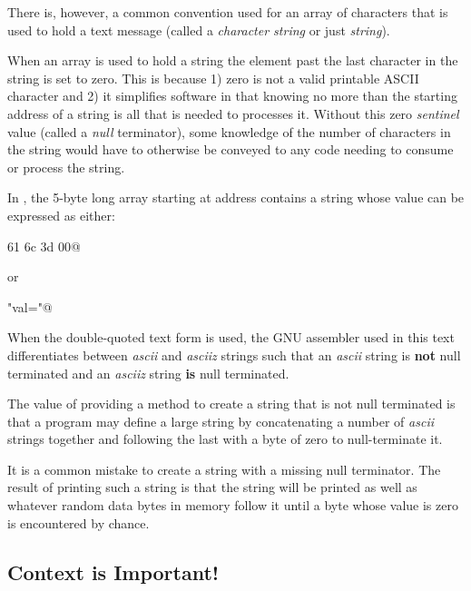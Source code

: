 There is, however, a common convention used for an array of 
characters that is used to hold a text message 
(called a {\em character string} or just {\em string}).

When an array is used to hold a string the element past the last
character in the string is set to zero.  This is because 1) zero 
is not a valid printable ASCII character and 2) it simplifies
software in that knowing no more than the starting address of a
string is all that is needed to processes it.  Without this zero
{\em sentinel} value (called a {\em null} terminator), some knowledge
of the number of characters in the string would have to otherwise 
be conveyed to any code needing to consume or process the string.

In , the 5-byte long array starting 
at address  contains a string whose value can be
expressed as either: %

 61 6c 3d 00@

or

\verb@"val="@


When the double-quoted text form is used, the GNU assembler used in 
this text differentiates between {\em ascii} and {\em asciiz} strings
such that an {\em ascii} string is {\bf not} null terminated and an
{\em asciiz} string {\bf is} null terminated.  

The value of providing a method to create a string that is not
null terminated is that a program may define a large string by 
concatenating a number of {\em ascii} strings together and following the 
last with a byte of zero to null-terminate it.

It is a common mistake to create a string with a missing
null terminator.  The result of printing such a string is that
the string will be printed as well as whatever random data bytes in 
memory follow it until a byte whose value is zero is encountered 
by chance.

\subsection{Context is Important!}

